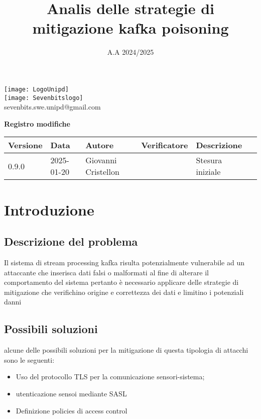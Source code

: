 \documentclass[10pt]{article}
\title{Analis delle strategie di mitigazione kafka poisoning}
\date{A.A 2024/2025}
\begin{document}
\maketitle
\begin{center}
\texttt{[image: LogoUnipd]}\\
\texttt{[image: Sevenbitslogo]}\\
sevenbits.swe.unipd@gmail.com\\
\vspace{2mm}

\textbf{Registro modifiche}\\
\vspace{2mm}
\begin{tabular}{|l|l|l|l|l|l|}
\hline
\textbf{Versione} & \textbf{Data} & \textbf{Autore} & \textbf{Verificatore} & \textbf{Descrizione} \\
\hline
0.9.0 & 2025-01-20 & Giovanni Cristellon &  & Stesura iniziale\\
\hline
\end{tabular}
\end{center}

\newpage
\tableofcontents
\newpage
\section{Introduzione}
\subsection{Descrizione del problema}
Il sistema di stream processing kafka risulta potenzialmente vulnerabile ad un attaccante che inserisca
dati falsi o malformati al fine di alterare il comportamento del sistema pertanto è necessario applicare delle strategie
di mitigazione che verifichino origine e correttezza dei dati e limitino i potenziali danni
\subsection{Possibili soluzioni}
alcune delle possibili soluzioni per la mitigazione di questa tipologia di attacchi sono le seguenti:
	\begin{itemize}
	\item Uso del protocollo TLS per la comunicazione sensori-sistema;
	\item utenticazione sensoi mediante SASL
	\item Definizione policies di access control
	\end{itemize}
\end{document}
